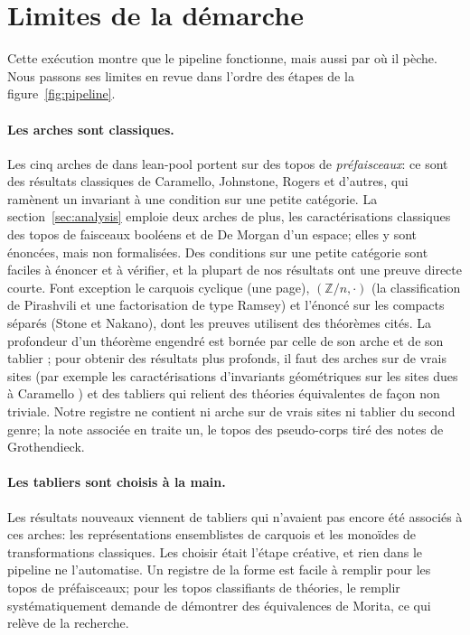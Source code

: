 \section{Limites de la démarche}\label{sec:limits}

Cette exécution montre que le pipeline fonctionne, mais aussi par où il pèche. Nous passons ses limites en revue dans l'ordre des étapes de la figure~\ref{fig:pipeline}.

\paragraph{Les arches sont classiques.} Les cinq arches de \lp{} dans lean-pool portent sur des topos de \emph{préfaisceaux}: ce sont des résultats classiques de Caramello, Johnstone, Rogers et d'autres, qui ramènent un invariant à une condition sur une petite catégorie. La section~\ref{sec:analysis} emploie deux arches de plus, les caractérisations classiques des topos de faisceaux booléens et de De Morgan d'un espace; elles y sont énoncées, mais non formalisées. Des conditions sur une petite catégorie sont faciles à énoncer et à vérifier, et la plupart de nos résultats ont une preuve directe courte. Font exception le carquois cyclique (une page), $(\mathbb Z/n,\cdot)$ (la classification de Pirashvili et une factorisation de type Ramsey) et l'énoncé sur les compacts séparés (Stone et Nakano), dont les preuves utilisent des théorèmes cités. La profondeur d'un théorème engendré est bornée par celle de son arche et de son tablier \cite[transparent 8]{caramello-mines}; pour obtenir des résultats plus profonds, il faut des arches sur de vrais sites (par exemple les caractérisations d'invariants géométriques sur les sites dues à Caramello \cite{caramello-tst}) et des tabliers qui relient des théories équivalentes de façon non triviale. Notre registre ne contient ni arche sur de vrais sites ni tablier du second genre; la note associée \cite{bridges-notes} en traite un, le topos des pseudo-corps tiré des notes de Grothendieck.

\paragraph{Les tabliers sont choisis à la main.} Les résultats nouveaux viennent de tabliers qui n'avaient pas encore été associés à ces arches: les représentations ensemblistes de carquois et les monoïdes de transformations classiques. Les choisir était l'étape créative, et rien dans le pipeline ne l'automatise. Un registre de la forme  est facile à remplir pour les topos de préfaisceaux; pour les topos classifiants de théories, le remplir systématiquement demande de démontrer des équivalences de Morita, ce qui relève de la recherche.

